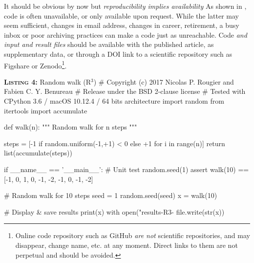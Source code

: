 \documentclass[a4paper,11pt]{article}
\begin{document}
It should be obvious by now but \emph{reproducibility implies availability} As shown in \citep{Collberg:2016}, code is often unavailable, or only available upon request. While the latter may seem sufficient, changes in email address, changes in career, retirement, a busy inbox or poor archiving practices can make a code just as unreachable. Code \emph{and input and result files} should be available with the published article, as supplementary data, or through a DOI link to a scientific repository such as Figshare or Zenodo\footnote{Online code repository such as GitHub \emph{are not} scientific repositories, and may disappear, change name, etc. at any moment. Direct links to them are not perpetual and should be avoided.}.\\


 
\begin{code}{\textbf{\textsc{Listing 4:}} Random walk (R$^3$)}
# Copyright (c) 2017 Nicolas P. Rougier and Fabien C. Y. Benureau
# Release under the BSD 2-clause license
# Tested with CPython 3.6 / macOS 10.12.4 / 64 bits architecture
import random
from itertools import accumulate

def walk(n):
    """ Random walk for n steps """
  
    steps = [-1 if random.uniform(-1,+1) < 0 else +1 for i in range(n)]
    return list(accumulate(steps))

if __name__ == '__main__':
    # Unit test
    random.seed(1)
    assert walk(10) == [-1, 0, 1, 0, -1, -2, -1, 0, -1, -2]

    # Random walk for 10 steps
    seed = 1
    random.seed(seed)
    x = walk(10)
    
    # Display & save results
    print(x)
    with open("results-R3-%
        file.write(str(x))
\end{code}
\end{document}
